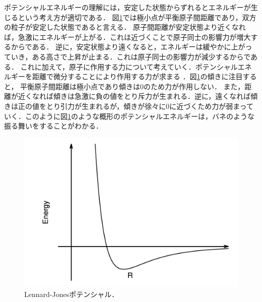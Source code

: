 ポテンシャルエネルギーの理解には，安定した状態からずれるとエネルギーが生じるという考え方が適切である．
図\ref{fig:lennard}では極小点が平衡原子間距離であり，双方の粒子が安定した状態であると言える．
原子間距離が安定状態より近くなれば，急激にエネルギーが上がる．これは近づくことで原子同士の影響力が増大するからである．
逆に，安定状態より遠くなると，エネルギーは緩やかに上がっていき，ある高さで上昇が止まる．これは原子同士の影響力が減少するからである．
これに加えて，原子に作用する力について考えていく．ポテンシャルエネルギーを距離で微分することにより作用する力が求まる
．図\ref{fig:lennard}の傾きに注目すると，
平衡原子間距離は極小点であり傾きは0のため力が作用しない．
また，距離が近くなれば傾きは急激に負の値をとり斥力が生まれる．逆に，遠くなれば傾きは正の値をとり引力が生まれるが，傾きが徐々に0に近づくため力が弱まっていく．このように図\ref{fig:lennard}のような概形のポテンシャルエネルギーは，バネのような振る舞いをすることがわかる．
\begin{figure}[htbp]
 \begin{center}
  \includegraphics[width=150mm]{../intro/lennard.png}
 \end{center}
 \caption{Lennard-Jonesポテンシャル．}
 \label{fig:lennard}
\end{figure}